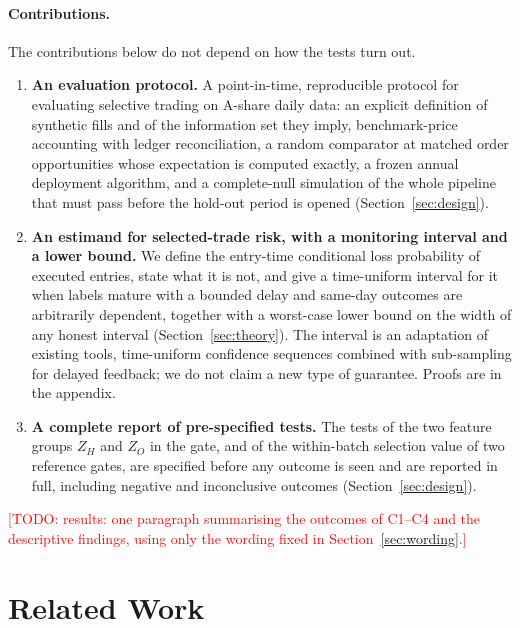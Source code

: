 \documentclass[11pt]{article}
\theoremstyle{remark}
\newcommand{\todo}[1]{\textcolor{red}{[TODO: #1]}}
\newcommand{\ZH}{Z_H}
\newcommand{\ZO}{Z_O}
\begin{document}
\paragraph{Contributions.}
The contributions below do not depend on how the tests turn out.
\begin{enumerate}
\item \textbf{An evaluation protocol.} A point-in-time, reproducible protocol for evaluating
selective trading on A-share daily data: an explicit definition of synthetic fills and of the
information set they imply, benchmark-price accounting with ledger reconciliation, a random
comparator at matched order opportunities whose expectation is computed exactly, a frozen annual
deployment algorithm, and a complete-null simulation of the whole pipeline that must pass before
the hold-out period is opened (Section~\ref{sec:design}).
\item \textbf{An estimand for selected-trade risk, with a monitoring interval and a lower bound.}
We define the entry-time conditional loss probability of executed entries, state what it is not,
and give a time-uniform interval for it when labels mature with a bounded delay and same-day
outcomes are arbitrarily dependent, together with a worst-case lower bound on the width of any
honest interval (Section~\ref{sec:theory}). The interval is an adaptation of existing tools,
time-uniform confidence sequences \citep{howard2021timeuniform} combined with sub-sampling for
delayed feedback; we do not claim a new type of guarantee. Proofs are in the appendix.
\item \textbf{A complete report of pre-specified tests.} The tests of the two feature groups
$\ZH$ and $\ZO$ in the gate, and of the within-batch selection value of two reference gates, are
specified before any outcome is seen and are reported in full, including negative and
inconclusive outcomes (Section~\ref{sec:design}).
\end{enumerate}
\todo{results: one paragraph summarising the outcomes of C1--C4 and the descriptive findings,
using only the wording fixed in Section~\ref{sec:wording}.}

\section{Related Work}
\label{sec:related}
\end{document}
